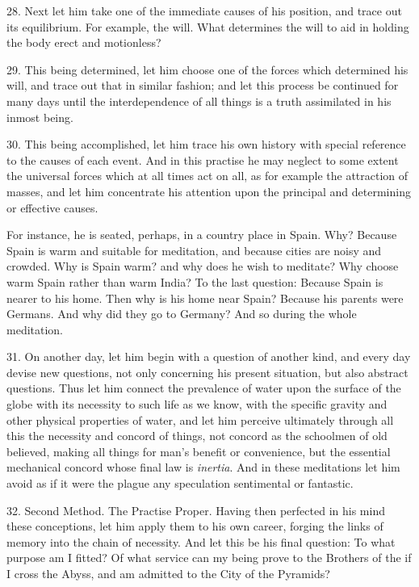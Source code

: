 28. Next let him take one of the immediate causes of his position, and trace out its equilibrium. For example, the will. What determines the will to aid in holding the body erect and motionless?

29. This being determined, let him choose one of the forces which determined his will, and trace out that in similar fashion; and let this process be continued for many days until the interdependence of all things is a truth assimilated in his inmost being.

30. This being accomplished, let him trace his own history with special reference to the causes of each event. And in this practise he may neglect to some extent the universal forces which at all times act on all, as for example the attraction of masses, and let him concentrate his attention upon the principal and determining or effective causes.

For instance, he is seated, perhaps, in a country place in Spain. Why? Because Spain is warm and suitable for meditation, and because cities are noisy and crowded. Why is Spain warm? and why does he wish to meditate? Why choose warm Spain rather than warm India? To the last question: Because Spain is nearer to his home. Then why is his home near Spain? Because his parents were Germans. And why did they go to Germany? And so during the whole meditation.

31. On another day, let him begin with a question of another kind, and every day devise new questions, not only concerning his present situation, but also abstract questions. Thus let him connect the prevalence of water upon the surface of the globe with its necessity to such life as we know, with the specific gravity and other physical properties of water, and let him perceive ultimately through all this the necessity and concord of things, not concord as the schoolmen of old believed, making all things for man’s benefit or convenience, but the essential mechanical concord whose final law is \textit{inertia}. And in these meditations let him avoid as if it were the plague any speculation sentimental or fantastic.

32. Second Method. The Practise Proper. Having then perfected in his mind these conceptions, let him apply them to his own career, forging the links of memory into the chain of necessity. And let this be his final question: To what purpose am I fitted? Of what service can my being prove to the Brothers of the \Argentium{}{} if I cross the Abyss, and am admitted to the City of the Pyramids?

